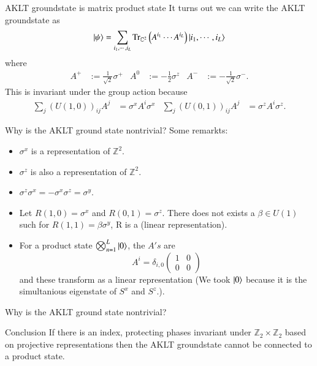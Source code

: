 \documentclass{beamer}
\newcommand{\CC}{\mathbb{C}}
\newcommand{\ZZ}{\mathbb{Z}}
\begin{document}
\begin{frame}{AKLT groundstate is matrix product state}
It turns out we can write the AKLT groundstate as
\begin{equation*}
\ket{\psi}=\sum_{i_1,\cdots,i_L}\textrm{Tr}_{\CC^2}\left(A^{i_1}\cdots A^{i_L}\right)\ket{i_1,\cdots ,i_L}
\end{equation*}
where
\begin{align*}
A^+&:=\frac{1}{\sqrt{2}}\sigma^+&A^0&:=-\frac{1}{2}\sigma^z&A^-&:=-\frac{1}{\sqrt{2}}\sigma^-.
\end{align*}
\pause
This is invariant under the group action because
\begin{align*}
\sum_j (U(1,0) )_{ij}A^j&=\sigma^x A^i \sigma^x&\sum_j (U(0,1) )_{ij}A^j&=\sigma^z A^i \sigma^z.
\end{align*}
\end{frame}

\begin{frame}{Why is the AKLT ground state nontrivial?}
Some remarkts:
\begin{itemize}
\item $\sigma^x$ is a representation of $\ZZ^2$.
\pause
\item $\sigma^z$ is also a representation of $\ZZ^2$.
\pause
\item $\sigma^z\sigma^x=-\sigma^x\sigma^z=\sigma^y$.
\pause
\item Let $R(1,0)=\sigma^x$ and $R(0,1)=\sigma^z$. There does not exists a $\beta\in U(1)$ such for $R(1,1)=\beta \sigma^y$, R is a (linear representation).
\pause
\item For a product state $\bigotimes_{n=1}^L\ket{0}$, the $A's$ are
\[A^i=\delta_{i,0}\begin{pmatrix}1&0\\0&0\end{pmatrix}\]
and these transform as a linear representation (We took $\ket{0}$ because it is the simultanious eigenstate of $S^x$ and $S^z$.).
\end{itemize}
\end{frame}

\begin{frame}{Why is the AKLT ground state nontrivial?}
\begin{block}{Conclusion}
If there is an index, protecting phases invariant under $\ZZ_2\times\ZZ_2$ based on projective representations then the AKLT groundstate cannot be connected to a product state.
\end{block}
\end{frame}
\end{document}
